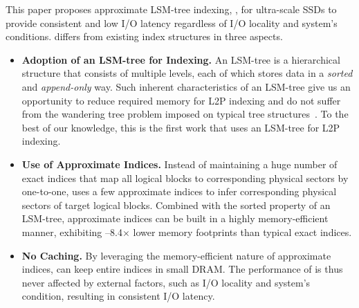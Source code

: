 This paper proposes approximate LSM-tree indexing, \textit{\ours{}}, 
for ultra-scale SSDs to provide consistent and low I/O latency
regardless of I/O locality and system's conditions.
\ours{} differs from existing index structures in three aspects. 
\begin{itemize}[leftmargin=*]
\item{\textbf{Adoption of an LSM-tree for Indexing.}}
An LSM-tree is a hierarchical structure that consists of multiple 
levels, each of which stores data
in a \emph{sorted} and \emph{append-only} way.
Such inherent characteristics of an LSM-tree give
us an opportunity to reduce required memory for L2P indexing
and do not suffer from the wandering tree problem 
imposed on typical tree structures~\cite{wandering-f2fs}.
To the best of our knowledge, 
this is the first work that uses an LSM-tree for L2P indexing.

\item{\textbf{Use of Approximate Indices.}}
Instead of maintaining a huge number of exact indices 
that map all logical blocks to corresponding physical sectors 
by one-to-one, \ours{} uses a few approximate indices 
to infer corresponding physical sectors of target logical blocks.
Combined with the sorted property of an LSM-tree, 
approximate indices can be built in a highly memory-efficient manner,
exhibiting --8.4$\times$ lower memory footprints 
than typical exact indices.

\item{\textbf{No Caching.}}
By leveraging the memory-efficient nature of approximate indices,
\ours{} can keep entire indices in small DRAM.
The performance of \ours{} is thus never affected by external factors,
such as I/O locality and system's condition, 
resulting in consistent I/O latency.
\end{itemize}

